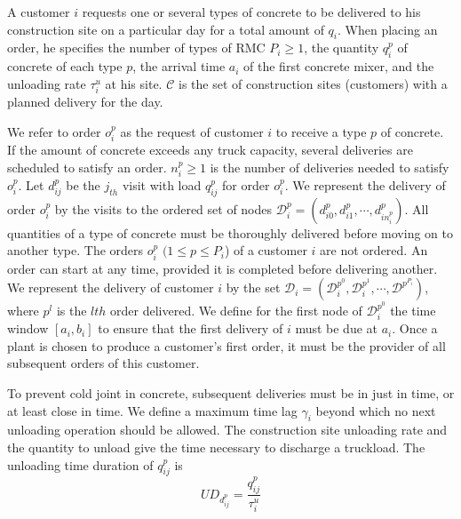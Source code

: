 \documentclass{article}
\begin{document}
{A customer $i$ requests one or several types of concrete to be delivered to his construction site on a particular day for a total amount of $q_i$. When placing an order, he specifies the number of types of RMC $P_i \geq 1$, the quantity $q^p_i$ of concrete of each type $p$, the arrival time $a_i$ of the first concrete mixer, and the unloading rate $\tau^u_i$ at his site. $\mathcal{C}$ is the set of construction sites (customers) with a planned delivery for the day.

We refer to order $o^p_i$ as the request of customer $i$ to receive a type $p$ of concrete. If the amount of concrete exceeds any truck capacity, several deliveries are scheduled to satisfy an order. $n^p_i \geq 1$ is the number of deliveries needed to satisfy $o^p_i$. Let $d^p_{ij}$ be the $j_{th}$ visit with load $q^p_{ij}$ for order $o^p_i$. We represent the delivery of order $o^p_i$ by the visits to the ordered set of nodes $\mathcal{D}^p_i= (d^p_{i0},d^p_{i1},\cdots, d^p_{in^p_i})$. All quantities of a type of concrete must be thoroughly delivered before moving on to another type. The orders $o^p_i$ $(1 \leq p \leq P_i$) of a customer $i$ are not ordered. An order can start at any time, provided it is completed before delivering another. We represent the delivery of customer $i$ by the set $\mathcal{D}_i= (\mathcal{D}^{p^0}_i, \mathcal{D}^{p^1}_i,\cdots,\mathcal{D}^{p^{P_i}})$, where $p^l$ is the $lth$ order delivered. We define for the first node of $\mathcal{D}^{p^0}_i$ the time window $ \left\lbrack a_i, b_i  \right\rbrack$ to ensure that the first delivery of $i$ must be due at $a_i$. Once a plant is chosen to produce a customer's first order, it must be the provider of all subsequent orders of this customer.

To prevent cold joint in concrete, subsequent deliveries must be in just in time, or at least close in time. We define a maximum time lag $\gamma_i$ beyond which no next unloading operation should be allowed. The construction site unloading rate and the quantity to unload give the time necessary to discharge a truckload. The unloading time duration of $q^p_{ij}$ is
\begin{equation}
    \label{eq:UD}
    {UD}_{d^p_{ij}} = \frac{q^p_{ij}}{\tau^u_i}
\end{equation}


}
\end{document}
